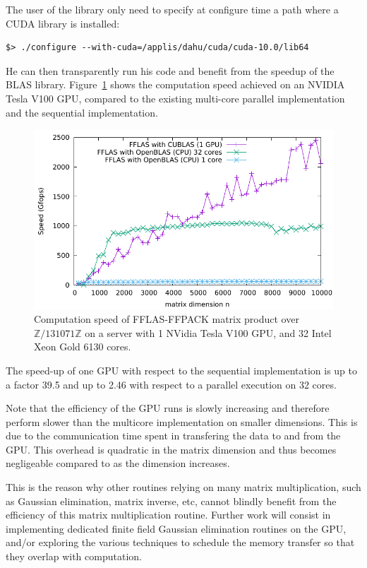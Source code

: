 The user of the library only need to specify at configure time a path where a CUDA library is installed:
\begin{verbatim}
$> ./configure --with-cuda=/applis/dahu/cuda/cuda-10.0/lib64
\end{verbatim}

He can then transparently run his code and benefit from the speedup of the BLAS library. Figure~\ref{fig:fgemm_gpu}
shows the computation speed achieved on an NVIDIA Tesla V100 GPU, compared to the existing multi-core parallel
implementation and the sequential implementation.

\begin{figure}[htb]
\begin{center}
  \includegraphics[width=.9\textwidth]{Pictures/fgemm_GPUvsCPU}
\end{center}
\caption{Computation speed of FFLAS-FFPACK matrix product over $\mathbb{Z}/131071\mathbb{Z}$ on a server with 1 NVidia  Tesla V100 GPU, and 32 Intel Xeon Gold 6130 cores.}\label{fig:fgemm_gpu}
\end{figure}
The speed-up of one GPU with respect to the sequential implementation is up to a factor 39.5 and up to 2.46 with respect
to a parallel execution on 32 cores.

Note that the efficiency of the GPU runs is slowly increasing and therefore perform slower than the multicore
implementation on smaller dimensions. This is due to the communication  time spent in transfering the data to and from
the GPU. This overhead is quadratic in the matrix dimension and thus becomes negligeable compared to as the dimension
increases.

This is the reason why other routines relying on many matrix multiplication, such as Gaussian elimination, matrix
inverse, etc, cannot blindly benefit from the efficiency of this matrix multiplication routine. Further work will
consist in implementing dedicated finite field Gaussian elimination routines on the GPU, and/or exploring the various
techniques to schedule the memory transfer so that they overlap with computation.





